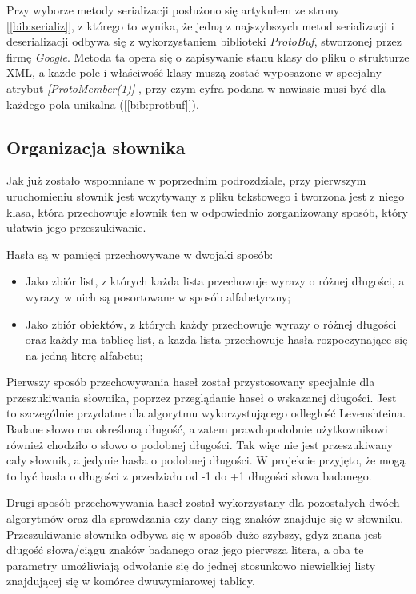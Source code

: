 Przy wyborze metody serializacji posłużono się artykułem ze strony [\ref{bib:serializ}], z którego to wynika, że jedną z najszybszych metod serializacji i deserializacji odbywa się z wykorzystaniem biblioteki \textit{ProtoBuf}, stworzonej przez firmę \textit{Google}. Metoda ta opera się o zapisywanie stanu klasy do pliku o strukturze XML, a każde pole i właściwość klasy muszą zostać wyposażone w specjalny atrybut \textit{[ProtoMember(1)]} , przy czym cyfra podana w nawiasie musi być dla każdego pola unikalna ([\ref{bib:protbuf}]).

\subsection{Organizacja słownika}

Jak już zostało wspomniane w poprzednim podrozdziale, przy pierwszym uruchomieniu słownik jest wczytywany z pliku tekstowego i tworzona jest z niego klasa, która przechowuje słownik ten w odpowiednio zorganizowany sposób, który ułatwia jego przeszukiwanie. 

Hasła są w pamięci przechowywane w dwojaki sposób:
\begin{itemize}
	\item Jako zbiór list, z których każda lista przechowuje wyrazy o różnej długości, a wyrazy w nich są posortowane w sposób alfabetyczny;
	\item Jako zbiór obiektów, z których każdy przechowuje wyrazy o różnej długości oraz każdy ma tablicę list, a każda lista przechowuje hasła rozpoczynające się na jedną literę alfabetu;
\end{itemize}

Pierwszy sposób przechowywania haseł został przystosowany specjalnie dla przeszukiwania słownika, poprzez przeglądanie haseł o wskazanej długości. Jest to szczególnie przydatne dla algorytmu wykorzystującego odległość Levenshteina. Badane słowo ma określoną długość, a zatem prawdopodobnie użytkownikowi również chodziło o słowo o podobnej długości. Tak więc nie jest przeszukiwany cały słownik, a jedynie hasła o podobnej długości. W projekcie przyjęto, że mogą to być hasła o długości z przedziału od -1 do +1 długości słowa badanego.

Drugi sposób przechowywania haseł został wykorzystany dla pozostałych dwóch algorytmów oraz dla sprawdzania czy dany ciąg znaków znajduje się w słowniku. Przeszukiwanie słownika odbywa się w sposób dużo szybszy, gdyż znana jest długość słowa/ciągu znaków badanego oraz jego pierwsza litera, a oba te parametry umożliwiają odwołanie się do jednej stosunkowo niewielkiej listy znajdującej się w komórce dwuwymiarowej tablicy.

